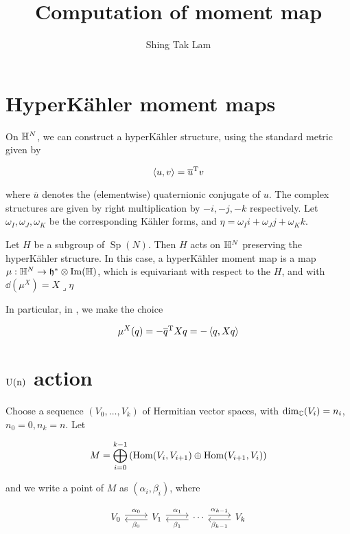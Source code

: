 \documentclass{article}
\title{Computation of moment map}
\author{Shing Tak Lam}
\DeclareMathOperator{\Sp}{Sp}
\begin{document}
\maketitle

\section{HyperK\"ahler moment maps}

On \(\mathbb{H}^N\), we can construct a hyperK\"ahler structure, using the standard metric given by

\[\left\langle u, v \right\rangle = \overline u^{\mathrm{T}} v\]

where \(\overline u\) denotes the (elementwise) quaternionic conjugate of \(u\). The complex structures are given by right multiplication by \(-i, -j, -k\) respectively. Let \(\omega_I, \omega_J, \omega_K\) be the corresponding K\"ahler forms, and \(\eta = \omega_I i + \omega_J j + \omega_K k\).

Let \(H\) be a subgroup of \(\Sp(N)\). Then \(H\) acts on \(\mathbb{H}^N\) preserving the hyperK\"ahler structure. In this case, a hyperK\"ahler moment map is a map \(\mu : \mathbb{H}^N \to \mathfrak{h}^* \otimes \Im(\mathbb{H})\), which is equivariant with respect to the \(H\), and with \(\dd(\mu^X) = X \lrcorner \eta\)

In particular, in \cite{kobak_classical_1996}, we make the choice

\[\mu^X(q) = -\overline q^{\mathrm{T}} X q = -\left\langle q, Xq \right\rangle\]

\section{\(\rm U(n)\) action}

Choose a sequence \((V_0, \dots, V_k)\) of Hermitian vector spaces, with \(\dim_{\mathbb{C}}(V_i) = n_i\), \(n_0 = 0, n_k = n\). Let

\[M = \bigoplus_{i=0}^{k-1}\left(\operatorname{Hom}(V_i, V_{i+1}) \oplus \operatorname{Hom}(V_{i+1}, V_i)\right)\]

and we write a point of \(M\) as \((\alpha_i, \beta_i)\), where

\[\begin{tikzcd}[ampersand replacement=\&]
	{V_0} \& {V_1} \& \cdots \& {V_k}
	\arrow["{\alpha_0}", shift left=1, from=1-1, to=1-2]
	\arrow["{\alpha_1}", shift left=1, from=1-2, to=1-3]
	\arrow["{\alpha_{k-1}}", shift left=1, from=1-3, to=1-4]
	\arrow["{\beta_{k-1}}", shift left=1, from=1-4, to=1-3]
	\arrow["{\beta_1}", shift left=1, from=1-3, to=1-2]
	\arrow["{\beta_0}", shift left=1, from=1-2, to=1-1]
\end{tikzcd}\]
\end{document}
